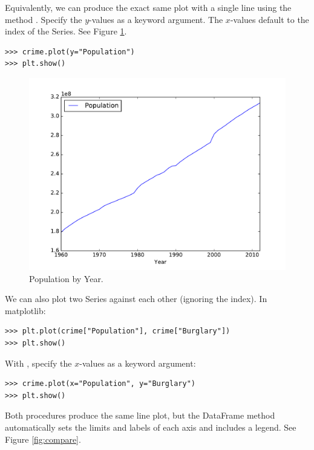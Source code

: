 Equivalently, we can produce the exact same plot with a single line using the  method .
Specify the $y$-values as a keyword argument.
The $x$-values default to the index of the Series.
See Figure \ref{fig:intro}.

\begin{lstlisting}
>>> crime.plot(y="Population")
>>> plt.show()
\end{lstlisting}


\begin{figure}[H] %
    \centering
    \includegraphics[scale=.5]{population.pdf}
    \caption{Population by Year.}
    \label{fig:intro}
\end{figure}

We can also plot two Series against each other (ignoring the index).
In matplotlib:

\begin{lstlisting}
>>> plt.plot(crime["Population"], crime["Burglary"])
>>> plt.show()
\end{lstlisting}

With , specify the $x$-values as a keyword argument:

\begin{lstlisting}
>>> crime.plot(x="Population", y="Burglary")
>>> plt.show()
\end{lstlisting}

Both procedures produce the same line plot, but the DataFrame method automatically sets the limits and labels of each axis and includes a legend.
See Figure \ref{fig:compare}.

